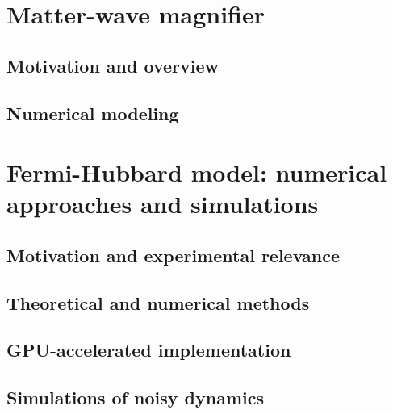 \documentclass[twoside]{article}
\begin{document}
\section{Matter-wave magnifier} \label{sec:mwm}

\subsection{Motivation and overview}

\subsection{Numerical modeling}


\newpage
\section{Fermi-Hubbard model: numerical approaches and simulations} \label{sec:fhmodel}

\subsection{Motivation and experimental relevance}

\subsection{Theoretical and numerical methods}

\subsection{GPU-accelerated implementation}

\subsection{Simulations of noisy dynamics}
\end{document}
